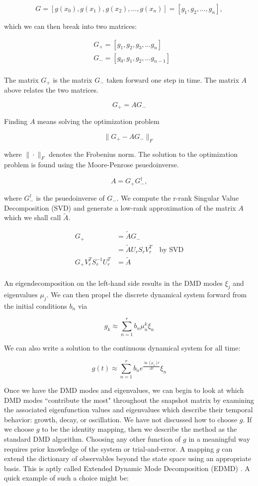 $$
G = [g(x_0), g(x_1), g(x_2), \dots ,g(x_n)] = [g_1,g_2,\dots, g_n],
$$

\noindent which we can then break into two matrices:

\begin{align*}
    & G_+ = [g_1, g_2, g_3, \dots g_n]\\
    & G_- = [g_0, g_1, g_2, \dots g_{n-1}]\\
\end{align*}

\noindent The matrix $G_+$ is the matrix $G_-$ taken forward one step in time. 
The matrix ${A}$ above relates the two matrices.

$$
G_+ = AG_-
$$

\noindent Finding $A$ means solving the optimization problem

$$
\|G_+ - {A}G_- \|_{F}
$$

\noindent where $\| \cdot \|_{F}$ denotes the Frobenius norm. The 
solution to the optimization problem is found using the Moore-Penrose psuedoinverse.

$$
A = G_+ G^{\dagger}_{-} ,
$$

\noindent where $G^{\dagger}_{-}$ is the psuedoinverse of $G_{-}$.
We compute the r-rank Singular Value Decomposition (SVD) and generate a low-rank approximation
of the matrix $A$ which we shall call ${\tilde A}$. 

\begin{align*}
    G_+ &= {\tilde A}G_- \\
    &= {\tilde A}U_rS_rV^{T}_r \quad \text{by SVD} \\ 
G_+ V^{T}_r S^{-1}_r U^{T}_r &= {\tilde A} \\
\end{align*}

\noindent An eigendecomposition on the left-hand side results in the 
DMD modes $\xi_j$ and eigenvalues $\mu_j$. We can then propel the discrete dynamical system forward from the 
initial conditions $b_n$ via

$$
g_k \approx \sum^{r}_{n=1} b_n \mu^{k}_n \xi_n
$$


\noindent We can also write a solution to the continuous dynamical system for all time:

$$
g(t) \approx \sum^{r}_{n=1} b_n e^{\frac{\ln(\mu_n)t}{\Delta t}} \xi_n
$$

Once we have the DMD modes and eigenvalues, we can begin to look at which DMD modes 
``contribute the most" throughout the snapshot matrix by examining the associated eigenfunction values and eigenvalues which describe
their temporal behavior: growth, decay, or oscillation. We have not
 discussed how to choose $g$. If we choose $g$ to 
be the identity mapping, then we describe the method as the standard DMD algorithm.
Choosing any other function of $g$ in a meaningful way requires prior knowledge of the system or trial-and-error. 
A mapping $g$ can extend the dictionary of observables beyond the state space using an appropriate 
basis. This is aptly called Extended Dynamic Mode Decomposition (EDMD) \cite{doi:10.1137/1.9781611974508}. A quick example of such
a choice might be:

